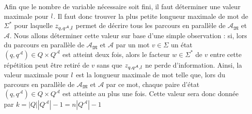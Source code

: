 \documentclass[12pt,a4paper,oneside,titlepage]{report}
\begin{document}
\noindent Afin que le nombre de variable nécessaire soit fini, il faut déterminer une valeur maximale pour $\mathnormal{l}$. Il faut donc trouver la plus petite longueur maximale de mot de $\Sigma^*$ pour laquelle $z_{q,q^\mathcal{A},\mathnormal{l}}$ permet de décrire tous les parcours en  parallèle de $\mathcal{A}_\mathfrak{M}$ et $\mathcal{A}$. Nous allons déterminer cette valeur sur base d'une simple observation : si, lors du parcours en parallèle de $\mathcal{A}_\mathfrak{M}$ et $\mathcal{A}$ par un mot $v\in\Sigma$ un état $(q,q^\mathcal{A})\in Q\times Q^\mathcal{A}$ est atteint deux fois, alors le facteur $w\in\Sigma^*$ de $v$ entre cette répétition peut être retiré de $v$ sans que $z_{q,q^\mathcal{A},\mathnormal{l}}$ ne perde d'information. Ainsi, la valeur maximale pour $\mathnormal{l}$ est la longueur maximale de mot telle que, lors du parcours en parallèle de $\mathcal{A}_\mathfrak{M}$ et $\mathcal{A}$ par ce mot, chaque paire d'état $(q,q^\mathcal{A})\in Q\times Q^\mathcal{A}$ est atteinte au plus une fois. Cette valeur sera donc donnée par $k=|Q||Q^\mathcal{A}|-1=n|Q^\mathcal{A}|-1$\\
\end{document}
